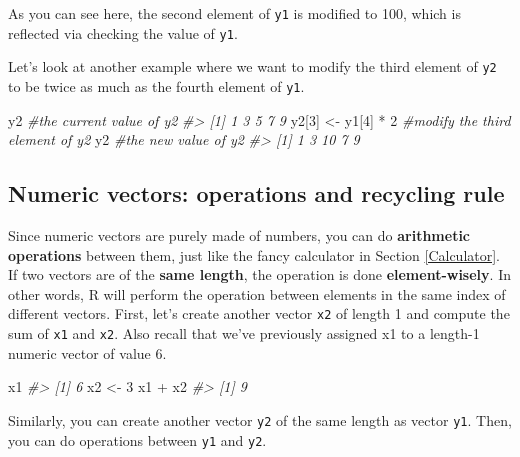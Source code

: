 \documentclass[
]{book}
\newenvironment{Shaded}{\begin{snugshade}}{\end{snugshade}}
\newcommand{\CommentTok}[1]{\textcolor[rgb]{0.56,0.35,0.01}{\textit{#1}}}
\newcommand{\DecValTok}[1]{\textcolor[rgb]{0.00,0.00,0.81}{#1}}
\newcommand{\NormalTok}[1]{#1}
\newcommand{\OtherTok}[1]{\textcolor[rgb]{0.56,0.35,0.01}{#1}}
\newcommand{\SpecialCharTok}[1]{\textcolor[rgb]{0.00,0.00,0.00}{#1}}
\begin{document}
As you can see here, the second element of \texttt{y1} is modified to 100, which is reflected via checking the value of \texttt{y1}.

Let's look at another example where we want to modify the third element of \texttt{y2} to be twice as much as the fourth element of \texttt{y1}.

\begin{Shaded}
\begin{Highlighting}[]
\NormalTok{y2                     }\CommentTok{\#the current value of y2}
\CommentTok{\#\textgreater{} [1] 1 3 5 7 9}
\NormalTok{y2[}\DecValTok{3}\NormalTok{] }\OtherTok{\textless{}{-}}\NormalTok{ y1[}\DecValTok{4}\NormalTok{] }\SpecialCharTok{*} \DecValTok{2}     \CommentTok{\#modify the third element of y2}
\NormalTok{y2                     }\CommentTok{\#the new value of y2}
\CommentTok{\#\textgreater{} [1]  1  3 10  7  9}
\end{Highlighting}
\end{Shaded}

\hypertarget{numeric-vectors-operations-and-recycling-rule-1}{%
\subsection{Numeric vectors: operations and recycling rule}\label{numeric-vectors-operations-and-recycling-rule-1}}

Since numeric vectors are purely made of numbers, you can do \textbf{arithmetic operations} between them, just like the fancy calculator in Section \ref{Calculator}. If two vectors are of the \textbf{same length}, the operation is done \textbf{element-wisely}. In other words, R will perform the operation between elements in the same index of different vectors. First, let's create another vector \texttt{x2} of length 1 and compute the sum of \texttt{x1} and \texttt{x2}. Also recall that we've previously assigned x1 to a length-1 numeric vector of value 6.

\begin{Shaded}
\begin{Highlighting}[]
\NormalTok{x1}
\CommentTok{\#\textgreater{} [1] 6}
\NormalTok{x2 }\OtherTok{\textless{}{-}} \DecValTok{3}
\NormalTok{x1 }\SpecialCharTok{+}\NormalTok{ x2}
\CommentTok{\#\textgreater{} [1] 9}
\end{Highlighting}
\end{Shaded}

Similarly, you can create another vector \texttt{y2} of the same length as vector \texttt{y1}. Then, you can do operations between \texttt{y1} and \texttt{y2}.
\end{document}
